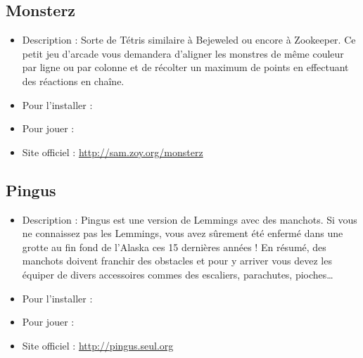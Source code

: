 \subsection{Monsterz}
\begin{itemize}
\begingroup
{}
\item Description : Sorte de Tétris similaire à Bejeweled ou encore à Zookeeper. Ce petit jeu d'arcade vous demandera d'aligner les monstres de même couleur par ligne ou par colonne et de récolter un maximum de points en effectuant des réactions en chaîne.{\par}
\item Pour l'installer : 
\item Pour jouer : 
\item Site officiel : \url{http://sam.zoy.org/monsterz}{\par}
\endgroup
\end{itemize}
\subsection{Pingus}
\begin{itemize}
\begingroup
{}
\item Description : Pingus est une version de Lemmings avec des manchots. Si vous ne connaissez pas les Lemmings, vous avez sûrement été enfermé dans une grotte au fin fond de l'Alaska ces 15 dernières années ! En résumé, des manchots doivent franchir des obstacles et pour y arriver vous devez les équiper de divers accessoires commes des escaliers, parachutes, pioches\ldots{}{\par}
\item Pour l'installer : 
\item Pour jouer : 
\item Site officiel : \url{http://pingus.seul.org}{\par}
\endgroup
\end{itemize}
